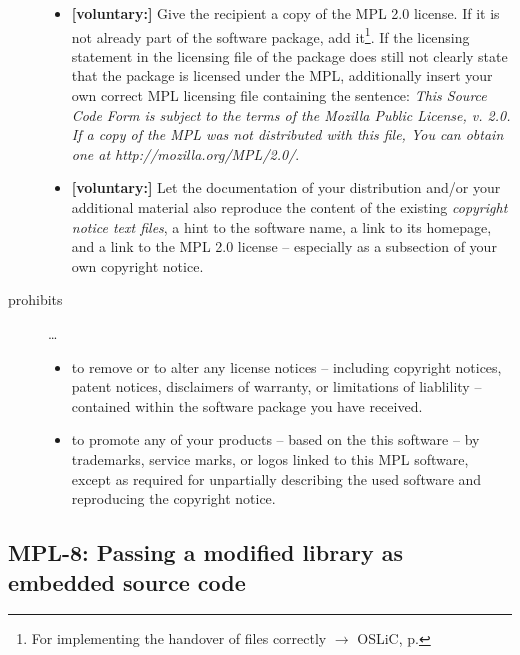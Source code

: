 \begin{description}
\begin{itemize}
  \item \textbf{[voluntary:]} Give the recipient a copy of the MPL 2.0 license.
  If it is not already part of the software package, add it\footnote{For
  implementing the handover of files correctly $\rightarrow$ OSLiC, p.
  \pageref{DistributingFilesHint}}. If the licensing statement in the licensing
  file of the package does still not clearly state that the package is licensed
  under the MPL, additionally insert your own correct MPL licensing file
  containing the sentence: \emph{This Source Code Form is subject to the terms
  of the Mozilla Public License, v. 2.0. If a copy of the MPL was not
  distributed with this file, You can obtain one at
  http://mozilla.org/MPL/2.0/}.
  
  \item \textbf{[voluntary:]} Let the documentation of your distribution and/or
  your additional material  also reproduce the content of the existing
  \emph{copyright notice text files}, a hint to the software name, a link to its
  homepage, and a link to the MPL 2.0 license -- especially as a subsection of
  your own copyright notice.
  
\end{itemize}

\item[prohibits] \ldots
\begin{itemize}
  \item to remove or to alter any license notices -- including copyright
  notices, patent notices, disclaimers of warranty, or limitations of liablility
  -- contained within the software package you have received.
  \item to promote any of your products -- based on the this software -- by
  trademarks, service marks, or logos linked to this MPL software, except as
  required for unpartially describing the used software and reproducing the
  copyright notice.
\end{itemize}

\end{description}

\subsection{MPL-8: Passing a modified library as embedded source code}
\label{OSUC-10S-MPL}


